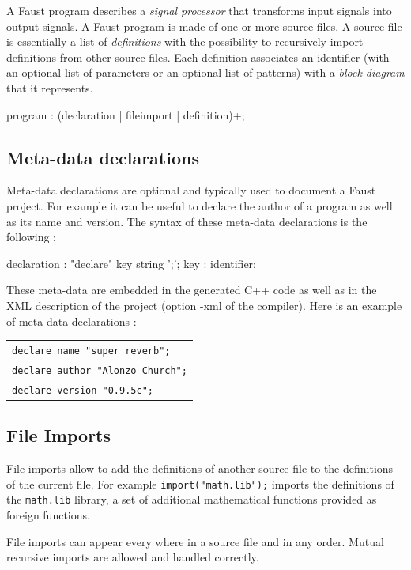 \documentclass{article}
\begin{document}
A Faust program describes a \emph{signal processor} that transforms input signals into output signals. A Faust program is made of one or more source files. A source file is essentially a list of \emph{definitions} with the possibility to recursively import definitions from other source files. Each definition associates an identifier (with an optional list of parameters or an optional list of patterns) with a \emph{block-diagram} that it represents.

\begin{rail}
program : (declaration | fileimport | definition)+;
\end{rail}

\subsection{Meta-data declarations}

Meta-data declarations are optional and typically used to document a Faust project. For example it can be useful to declare the author of a program as well as its name and version. The syntax of these meta-data declarations is the following :

\begin{rail}
declaration : "declare" key string ';';
key : identifier;
\end{rail}

These meta-data are embedded in the generated C++ code as well as in the XML description of the project (option -xml of the compiler). Here is an example of meta-data declarations :

\begin{tabular}{l}
	\texttt{declare name "super reverb";}\\
	\texttt{declare author "Alonzo Church";}\\
	\texttt{declare version "0.9.5c";}\\
\end{tabular}
 
\subsection{File Imports}

File imports allow to add the definitions of another source file to the definitions of the current file. 
For example \lstinline{import("math.lib");} imports the definitions of the \lstinline{math.lib} library, a set of additional mathematical functions provided as foreign functions.

File imports can appear every where in a source file and in any order. Mutual recursive imports are allowed and handled correctly.
\end{document}
